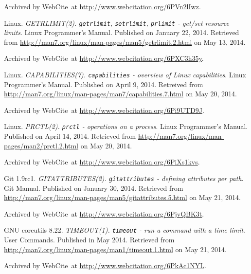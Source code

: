 \begin{thebibliography}{9}
Archived by WebCite\textsuperscript{\textregistered}\ at
\url{http://www.webcitation.org/6PVn2lIwz}.


Linux. \emph{GETRLIMIT(2). \texttt{getrlimit}, \texttt{setrlimit},
\texttt{prlimit} - get/set resource limits}.  Linux Programmer's Manual.
Published on January 22, 2014. Retrieved from
\url{http://man7.org/linux/man-pages/man5/getrlimit.2.html} on May 13, 2014.

Archived by WebCite\textsuperscript{\textregistered}\ at
\url{http://www.webcitation.org/6PXC3h35y}.


Linux. \emph{CAPABILITIES(7). \texttt{capabilities} - overview of Linux
capabilities}. Linux Programmer's Manual. Published on April 9, 2014. Retreived
from \url{http://man7.org/linux/man-pages/man7/capabilities.7.html} on May 20,
2014.

Archived by WebCite\textsuperscript{\textregistered}\ at
\url{http://www.webcitation.org/6Pi9UTD9J}.


Linux. \emph{PRCTL(2). \texttt{prctl} - operations on a process}. Linux
Programmer's Manual. Published on April 14, 2014. Retrieved from
\url{http://man7.org/linux/man-pages/man2/prctl.2.html} on May 20, 2014.

Archived by WebCite\textsuperscript{\textregistered}\ at
\url{http://www.webcitation.org/6PiXs1kvs}.


Git 1.9rc1. \emph{GITATTRIBUTES(2). \texttt{gitattributes} - defining
attributes per path}. Git Manual. Published on January 30, 2014. Retrieved from
\url{http://man7.org/linux/man-pages/man5/gitattributes.5.html} on May 21,
2014.

Archived by WebCite\textsuperscript{\textregistered}\ at
\url{http://www.webcitation.org/6PjvQBK3t}.


GNU coreutils 8.22. \emph{TIMEOUT(1). \texttt{timeout} - run a command with a
time limit}. User Commands. Published in May 2014. Retrieved from
\url{http://man7.org/linux/man-pages/man1/timeout.1.html} on May 21, 2014.

Archived by WebCite\textsuperscript{\textregistered}\ at
\url{http://www.webcitation.org/6PkAc1NYL}.


\end{thebibliography}
